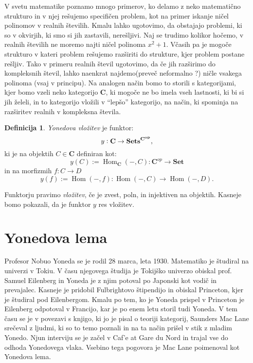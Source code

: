 \documentclass[12pt,a4paper]{book}
\theoremstyle{definition}
\newtheorem{definicija}{Definicija}[chapter]
\theoremstyle{plain}
\theoremstyle{definition}
\theoremstyle{remark}
\newcommand{\cat}[1]{\textbf{#1}}
\DeclareMathOperator{\Hom}{Hom}
\begin{document}
V svetu matematike poznamo mnogo primerov, ko delamo z neko matematično strukturo in v njej rešujemo specifičen problem, kot na primer iskanje ničel polinomov v realnih številih. Kmalu lahko ugotovimo, da obstajajo problemi, ki so v okvirjih, ki smo si jih zastavili, nerešljivi. Naj se trudimo kolikor hočemo, v realnih številih ne moremo najti ničel polinoma $x^2 + 1$.
Včasih pa je mogoče strukturo v kateri problem rešujemo razširiti do strukture, kjer problem postane rešljiv.
Tako v primeru realnih števil ugotovimo, da če jih razširimo do kompleksnih števil, lahko naenkrat najdemo(preveč neformalno ?) ničle vsakega polinoma (vsaj v principu). Na analogen način bomo to storili s kategorijami, kjer bomo vzeli neko kategorijo $\cat{C}$, ki mogoče ne bo imela vseh lastnosti, ki bi si jih želeli, in to kategorijo vložili v "`lepšo"' kategorijo, na način, ki spominja na razširitev realnih v kompleksna števila. 


\begin{definicija} \emph{Yonedova vložitev} je funktor: 
$$y : \bf{C} \to \bf{Sets}^{\bf{C}^{op}},$$
ki je na objektih $C \in \cat{C}$ definiran kot:
$$y(C) := \Hom_{\cat{C}}(-, C) : \cat{C}^{op} \to \cat{Set}$$ 
in na morfizmih $f : C \to D$
$$y(f) := \Hom(-,f) : \Hom(-,C) \to \Hom(-,D).$$
\end{definicija}

Funktorju pravimo \emph{vložitev}, če je zvest, poln, in injektiven na objektih. Kasneje bomo pokazali, da je funktor $y$ res vložitev. 

\section{Yonedova lema}

Profesor Nobuo Yoneda se je rodil 28 marca, leta 1930. Matematiko je študiral na univerzi v Tokiu. V času njegovega študija je Tokijško univerzo obiskal prof. Samuel Eilenberg in Yoneda je z njim potoval po Japonski kot vodič in prevajalec. Kasneje je pridobil Fulbrightovo štipendijo in obiskal Princeton, kjer je študiral pod Eilenbergom. Kmalu po tem, ko je Yoneda prispel v Princeton je Eilenberg odpotoval v Francijo, kar je po enem letu storil tudi Yoneda. V tem času se je v povezavi s knjigo, ki jo je pisal o teoriji kategorij, Saunders Mac Lane srečeval z ljudmi, ki so to temo poznali in na ta način prišel v stik z mladim Yonedo. Njun interviju se je začel v Caf'e at Gare du Nord in trajal vse do odhoda Yonedovega vlaka. Vsebino tega pogovora je Mac Lane poimenoval kot Yonedova lema.
\end{document}
